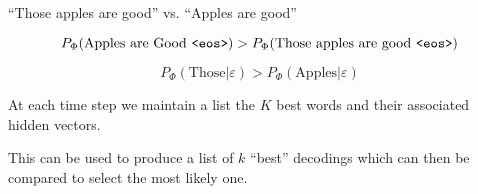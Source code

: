 {

``Those apples are good'' vs. ``Apples are good''

\vfill
$$P_\Phi(\mbox{Apples are Good {\tt <eos>}}) > P_\Phi(\mbox{Those apples are good {\tt <eos>}})$$

\vfill
$$P_\Phi(\mbox{Those}|\varepsilon) > P_\Phi(\mbox{Apples}|\varepsilon)$$
    

At each time step we maintain a list the $K$ best words and their associated hidden vectors.

\vfill
This can be used to produce a list of $k$ ``best'' decodings which can then be compared to select
the most likely one.

}

